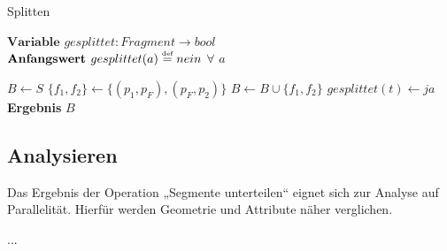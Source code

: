\documentclass[../main/thesis.tex]{subfiles}
\begin{document}
\begin{algorithm}[H]
\caption{Splitten}\label{alg:Splitten}
$\textbf{Variable } gesplittet : Fragment \rightarrow bool$
\\$\textbf{Anfangswert } gesplittet(a) \stackrel{\text{\tiny def}}{=} nein$ $\forall$ $a$
\begin{algorithmic}
	\State $B \gets S$
				\State $\{f_1, f_2\} \gets \{(p_1, p_F), (p_F, p_2)\}$
				\State $B \gets B \cup \{f_1, f_2\}$
				\State $gesplittet(t) \gets ja$
			\EndFor
		\EndFor
	\EndFor
	\State \textbf{Ergebnis} $B$
\EndFunction
\end{algorithmic}
\end{algorithm}



\subsection{Analysieren}

Das Ergebnis der Operation „Segmente unterteilen“ eignet sich zur Analyse auf Parallelität. Hierfür werden Geometrie und Attribute näher verglichen.


...

%
%
\end{document}
